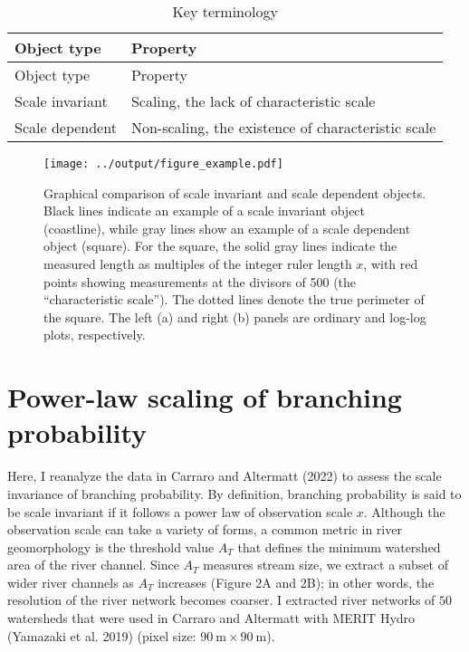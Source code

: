 \documentclass[
  12pt,
]{article}
\begin{document}
\begin{longtable}[]{@{}ll@{}}
\caption{Key terminology}\tabularnewline
\toprule()
Object type & Property \\
\midrule()
\endfirsthead
\toprule()
Object type & Property \\
\midrule()
\endhead
Scale invariant & Scaling, the lack of characteristic scale \\
Scale dependent & Non-scaling, the existence of characteristic scale \\
\bottomrule()
\end{longtable}

\begin{figure}
\centering
\texttt{[image: ../output/figure\_example.pdf]}
\caption{\label{fig:example}Graphical comparison of scale invariant and scale dependent objects. Black lines indicate an example of a scale invariant object (coastline), while gray lines show an example of a scale dependent object (square). For the square, the solid gray lines indicate the measured length as multiples of the integer ruler length \(x\), with red points showing measurements at the divisors of 500 (the ``characteristic scale''). The dotted lines denote the true perimeter of the square. The left (a) and right (b) panels are ordinary and log-log plots, respectively.}
\end{figure}

\hypertarget{power-law-scaling-of-branching-probability}{%
\section{Power-law scaling of branching probability}\label{power-law-scaling-of-branching-probability}}

Here, I reanalyze the data in Carraro and Altermatt (2022) to assess the scale invariance of branching probability. By definition, branching probability is said to be scale invariant if it follows a power law of observation scale \(x\). Although the observation scale can take a variety of forms, a common metric in river geomorphology is the threshold value \(A_T\) that defines the minimum watershed area of the river channel. Since \(A_T\) measures stream size, we extract a subset of wider river channels as \(A_T\) increases (Figure 2A and 2B); in other words, the resolution of the river network becomes coarser. I extracted river networks of \(50\) watersheds that were used in Carraro and Altermatt with MERIT Hydro (Yamazaki et al. 2019) (pixel size: \(90~\text{m} \times 90~\text{m}\)).
\end{document}
